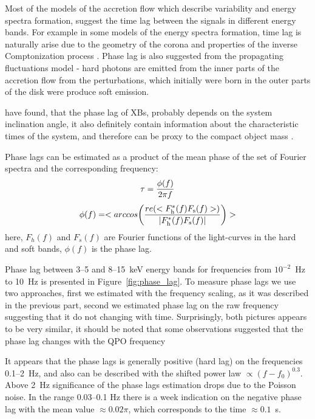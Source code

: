 \documentclass[a4paper,fleqn,usenatbib]{mnras}
\begin{document}
{    Most of the models of the accretion flow which describe variability and energy spectra formation, suggest the time lag between the signals in different energy bands. 
For example in some models of the energy spectra formation, time lag is naturally arise due to the geometry of the corona and properties of the inverse Comptonization process \citep[see, e.g.][]{kotov01}.
Phase lag is also suggested from the propagating fluctuations model - hard photons are emitted from the inner parts of the accretion flow from the perturbations, which initially were born in the outer parts of the disk were produce soft emission.  

\citep{eijeden17} have found, that the phase lag of XBs, probably depends on the system inclination angle, it also definitely contain information about the characteristic times of the system, and therefore can be proxy to the compact object mass \citep{}. 

Phase lags can be estimated as a product of the mean phase of the set of Fourier spectra and the corresponding frequency:
\begin{equation}
                \tau = \frac{\phi(f)}{2\pi f}\\
\end{equation}
\begin{equation}
        \phi(f) = <arccos{\left(\frac{re(<F_{\rm h}^{*}(f)F_{\rm s}(f)>)}{|F_{\rm h}^{*}(f) F_{\rm s}(f)|}\right)}>
        \label{eq:phase_lag}
\end{equation}
here, $F_h(f)$ and $F_s(f)$ are Fourier functions of the light-curves in the hard and soft bands, $\phi(f)$ is the phase lag. 

Phase lag between 3--5 and 8--15~keV energy bands for frequencies from $10^{-2}$~Hz to 10~Hz is presented in Figure~\ref{fig:phase_lag}.
To measure phase lags we use two approaches, first we estimated with the frequency scaling, as it was described in the previous part, second we estimated phase lag on the raw frequency suggesting that it do not changing with time.
Surprisingly, both pictures appears to be very similar, it should be noted that some observations suggested that the phase lag changes with the QPO frequency \citep{}

It appears that the phase lags is generally positive (hard lag) on the frequencies 0.1--2~Hz, and also can be described with the shifted power law $\propto(f - f_0)^{0.3}$. 
Above 2~Hz significance of the phase lags estimation drops due to the Poisson noise.
In the range 0.03--0.1 Hz there is a week indication on the negative phase lag with the mean value $\approx 0.02\pi$, which corresponds to the time $\approx0.1$~s.



}
\end{document}
